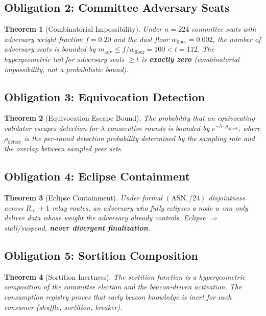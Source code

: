 \documentclass[11pt, a4paper]{article}
\theoremstyle{plain}
\newtheorem{theorem}{Theorem}
\theoremstyle{definition}
\theoremstyle{remark}
\begin{document}
\subsection{Obligation 2: Committee Adversary Seats}

\begin{theorem}[Combinatorial Impossibility]
\label{thm:committee}
Under $n = 224$ committee seats with adversary weight fraction
 $f = 0.20$ and the dust floor $w_{\text{floor}} = 0.002$, the number
of adversary seats is bounded by $m_{\text{adv}} \le f / w_{\text{floor}}
= 100 < t = 112$. The hypergeometric tail for adversary seats
 $\ge t$ is \textbf{exactly zero} (combinatorial impossibility, not a
probabilistic bound).
\end{theorem}

\subsection{Obligation 3: Equivocation Detection}

\begin{theorem}[Equivocation Escape Bound]
\label{thm:equivocation}
The probability that an equivocating validator escapes detection for
 $\lambda$ consecutive rounds is bounded by $e^{-\lambda \cdot
\rho_{\text{detect}}}$, where $\rho_{\text{detect}}$ is the per-round
detection probability determined by the sampling rate and the overlap
between sampled peer sets.
\end{theorem}

\subsection{Obligation 4: Eclipse Containment}

\begin{theorem}[Eclipse Containment]
\label{thm:eclipse}
Under formal $(\text{ASN}, /24)$ disjointness across $R_{\text{rel}} + 1$ relay routes, an adversary who fully eclipses a node $u$ can only
deliver data whose weight the adversary already controls. Eclipse
 $\Rightarrow$ stall/suspend, \textbf{never divergent finalization}.
\end{theorem}

\subsection{Obligation 5: Sortition Composition}

\begin{theorem}[Sortition Inertness]
\label{thm:sortition}
The sortition function is a hypergeometric composition of the committee
election and the beacon-driven activation. The consumption registry
proves that early beacon knowledge is inert for each consumer (shuffle,
sortition, breaker).
\end{theorem}
\end{document}
